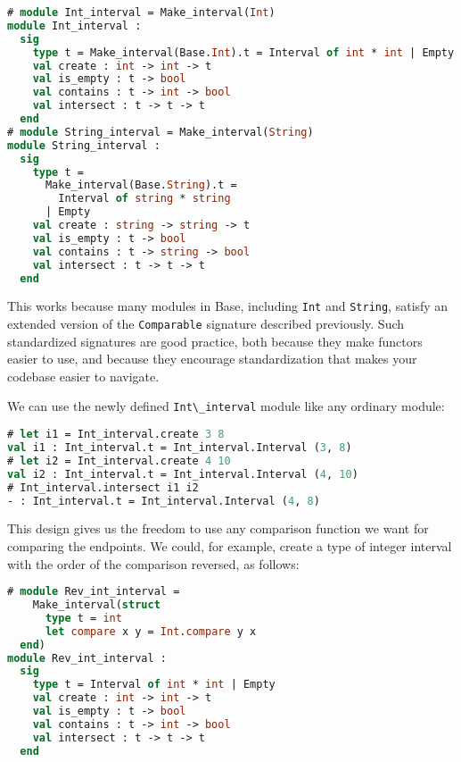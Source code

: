 \begin{lstlisting}[language=Caml]
# module Int_interval = Make_interval(Int)
module Int_interval :
  sig
    type t = Make_interval(Base.Int).t = Interval of int * int | Empty
    val create : int -> int -> t
    val is_empty : t -> bool
    val contains : t -> int -> bool
    val intersect : t -> t -> t
  end
# module String_interval = Make_interval(String)
module String_interval :
  sig
    type t =
      Make_interval(Base.String).t =
        Interval of string * string
      | Empty
    val create : string -> string -> t
    val is_empty : t -> bool
    val contains : t -> string -> bool
    val intersect : t -> t -> t
  end
\end{lstlisting}

This works because many modules in Base, including
\passthrough{\lstinline!Int!} and \passthrough{\lstinline!String!},
satisfy an extended version of the \passthrough{\lstinline!Comparable!}
signature described previously. Such standardized signatures are good
practice, both because they make functors easier to use, and because
they encourage standardization that makes your codebase easier to
navigate.

We can use the newly defined \passthrough{\lstinline!Int\_interval!}
module like any ordinary module:

\begin{lstlisting}[language=Caml]
# let i1 = Int_interval.create 3 8
val i1 : Int_interval.t = Int_interval.Interval (3, 8)
# let i2 = Int_interval.create 4 10
val i2 : Int_interval.t = Int_interval.Interval (4, 10)
# Int_interval.intersect i1 i2
- : Int_interval.t = Int_interval.Interval (4, 8)
\end{lstlisting}

This design gives us the freedom to use any comparison function we want
for comparing the endpoints. We could, for example, create a type of
integer interval with the order of the comparison reversed, as
follows:

\begin{lstlisting}[language=Caml]
# module Rev_int_interval =
    Make_interval(struct
      type t = int
      let compare x y = Int.compare y x
  end)
module Rev_int_interval :
  sig
    type t = Interval of int * int | Empty
    val create : int -> int -> t
    val is_empty : t -> bool
    val contains : t -> int -> bool
    val intersect : t -> t -> t
  end
\end{lstlisting}

